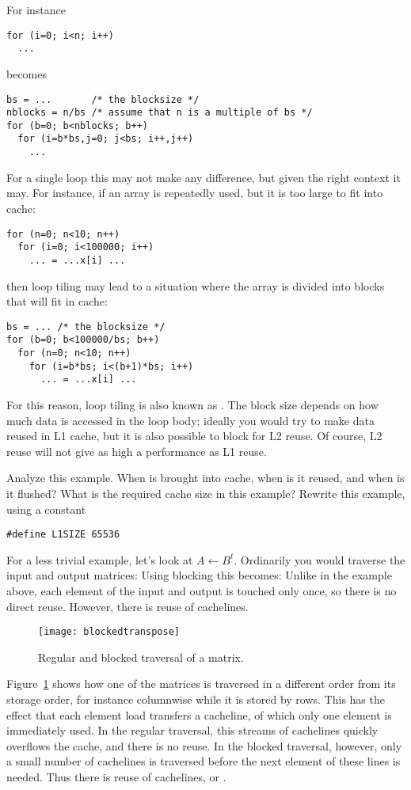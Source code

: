 For instance
\begin{verbatim}
for (i=0; i<n; i++)
  ...
\end{verbatim}
becomes
\begin{verbatim}
bs = ...       /* the blocksize */
nblocks = n/bs /* assume that n is a multiple of bs */
for (b=0; b<nblocks; b++)
  for (i=b*bs,j=0; j<bs; i++,j++)
    ...
\end{verbatim}
For a single loop this may not make any difference, but given the
right context it may. For instance, if an array is repeatedly used,
but it is too large to fit into cache:
\begin{verbatim}
for (n=0; n<10; n++)
  for (i=0; i<100000; i++)
    ... = ...x[i] ...

\end{verbatim}
then loop tiling may lead to a situation where the array is divided
into blocks that will fit in cache:
\begin{verbatim}
bs = ... /* the blocksize */
for (b=0; b<100000/bs; b++)
  for (n=0; n<10; n++)
    for (i=b*bs; i<(b+1)*bs; i++)
      ... = ...x[i] ...
\end{verbatim}
For this reason, loop tiling is also known as
. The block size depends on how much
data is accessed in the loop body; ideally you would try to make data
reused in L1 cache, but it is also possible to block for L2 reuse. Of
course, L2 reuse will not give as high a performance as L1 reuse.

\begin{exercise}
  Analyze this example. When is  brought into cache, when is it
  reused, and when is it flushed? What is the required cache size in
  this example? Rewrite this example, using a constant
\begin{verbatim}
#define L1SIZE 65536
\end{verbatim}
\end{exercise}

For a less trivial example, let's look at
 $A\leftarrow B^t$. Ordinarily you would traverse
the input and output matrices:
%
%
Using blocking this becomes:
%
%
Unlike in the example above, each element of the input and output is
touched only once, so there is no direct reuse. However, there is
reuse of cachelines. 

\begin{figure}[ht]
  \texttt{[image: blockedtranspose]}
  \caption{Regular and blocked traversal of a matrix.}
  \label{fig:blockedtranspose}
\end{figure}
Figure~\ref{fig:blockedtranspose} shows how one of the matrices is
traversed in a different order from its storage order, for instance
columnwise while it is stored by rows. This has the effect that each
element load transfers a cacheline, of which only one element is
immediately used. In the regular traversal, this streams of cachelines
quickly overflows the cache, and there is no reuse. In the blocked
traversal, however, only a small number of cachelines is traversed
before the next element of these lines is needed. Thus there is reuse
of cachelines, or .

